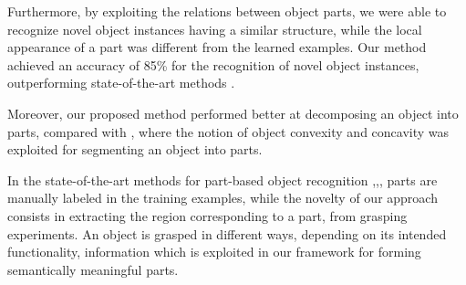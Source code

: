 \documentclass[a4paper,11pt,pdf]{pacmanreport}
\begin{document}
Furthermore, by exploiting the relations between object parts, we were able to recognize novel object instances having a similar structure, while the local appearance of a part was different from the learned examples. Our method achieved an accuracy of 85\% for the recognition of novel object instances, outperforming state-of-the-art methods \cite{vfh}. 

Moreover, our proposed method performed better at decomposing an object into parts, compared with \cite{rel7}, where the notion of object convexity and concavity was exploited for segmenting an object into parts.

In the state-of-the-art methods for part-based object recognition \cite{part2},\cite{part1},\cite{part3}, parts are manually labeled in the training examples, while the novelty of our approach consists in extracting the region corresponding to a part, from grasping experiments. An object is grasped in different ways, depending on its intended functionality, information which is exploited in our framework for forming semantically meaningful parts.

\newpage






 
\end{document}
